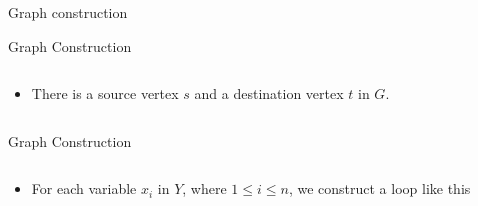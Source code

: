 \documentclass[xcolor=dvipsnames]{beamer}
\begin{document}
\begin{section}{Graph construction }

\begin{frame}{Graph Construction}
\begin{columns}
\begin{column}{0.45\textwidth}
\begin{itemize}
\item<1->There is a source vertex $s$ and a destination vertex $t$ in $G$.
\end{itemize}
\end{column}
\begin{column}{0.55\textwidth}
    \begin{overlayarea}{0.55\textwidth}{8cm}
        
    \end{overlayarea}
\end{column}
\end{columns}
\end{frame}

\begin{frame}{Graph Construction}
\begin{columns}
\begin{column}{0.45\textwidth}
\begin{itemize}
\item For each variable $x_i$ in $Y$, where $1 \leq i \leq n$, we construct a loop like this
\end{itemize}
\end{column}
\begin{column}{0.55\textwidth}
    \begin{overlayarea}{0.55\textwidth}{8cm}
        
    \end{overlayarea}
\end{column}
\end{columns}
\end{frame}


\end{section}
\end{document}
